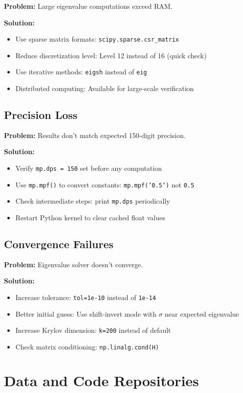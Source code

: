 \textbf{Problem:} Large eigenvalue computations exceed RAM.

\textbf{Solution:}
\begin{itemize}
\item Use sparse matrix formats: \texttt{scipy.sparse.csr\_matrix}
\item Reduce discretization level: Level 12 instead of 16 (quick check)
\item Use iterative methods: \texttt{eigsh} instead of \texttt{eig}
\item Distributed computing: Available for large-scale verification
\end{itemize}

\subsection{Precision Loss}

\textbf{Problem:} Results don't match expected 150-digit precision.

\textbf{Solution:}
\begin{itemize}
\item Verify \texttt{mp.dps = 150} set before any computation
\item Use \texttt{mp.mpf()} to convert constants: \texttt{mp.mpf('0.5')} not \texttt{0.5}
\item Check intermediate steps: print \texttt{mp.dps} periodically
\item Restart Python kernel to clear cached float values
\end{itemize}

\subsection{Convergence Failures}

\textbf{Problem:} Eigenvalue solver doesn't converge.

\textbf{Solution:}
\begin{itemize}
\item Increase tolerance: \texttt{tol=1e-10} instead of \texttt{1e-14}
\item Better initial guess: Use shift-invert mode with $\sigma$ near expected eigenvalue
\item Increase Krylov dimension: \texttt{k=200} instead of default
\item Check matrix conditioning: \texttt{np.linalg.cond(H)}
\end{itemize}

\section{Data and Code Repositories}
\label{sec:repositories}

